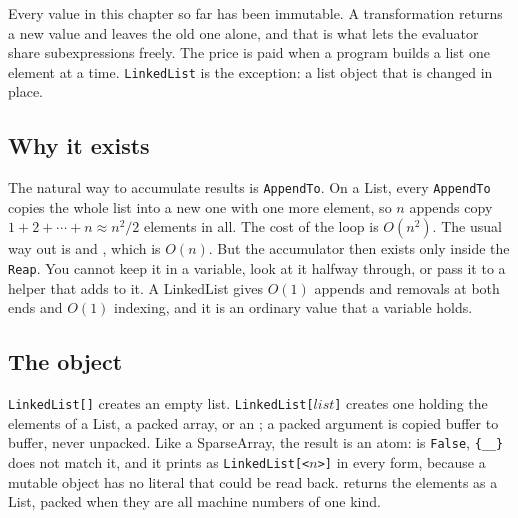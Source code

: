 Every value in this chapter so far has been immutable. A transformation returns a new
value and leaves the old one alone, and that is what lets the evaluator share
subexpressions freely. The price is paid when a program builds a list one element at a
time. \texttt{LinkedList} is the exception: a list object that is
changed in place.

\subsection{Why it exists}
\label{ssec:ds-ll-why}

The natural way to accumulate results is \texttt{AppendTo}. On a List, every
\texttt{AppendTo} copies the whole list into a new one with one more element, so
\(n\) appends copy \(1+2+\cdots+n\approx n^2/2\) elements in all. The cost of the loop
is \(O(n^2)\). The usual way out is
 and , which is \(O(n)\). But the accumulator then exists only inside
the \texttt{Reap}. You cannot keep it in a variable, look at it halfway through, or
pass it to a helper that adds to it. A LinkedList gives \(O(1)\) appends and removals
at both ends and \(O(1)\) indexing, and it is an ordinary value that a variable holds.

\begin{codepairs}
\end{codepairs}

\subsection{The object}
\label{ssec:ds-ll-object}

\texttt{LinkedList[]} creates an empty list. \texttt{LinkedList[\(\mathit{list}\)]}
creates one holding the elements of a List, a packed array, or an ; a packed
argument is copied buffer to buffer, never unpacked. Like a SparseArray, the result is
an atom:  is \texttt{False}, \texttt{\{\_\_\}} does
not match it, and it prints as \texttt{LinkedList[<\(n\)>]} in every form, because a
mutable object has no literal that could be read back.  returns the
elements as a List, packed when they are all machine numbers of one kind.

